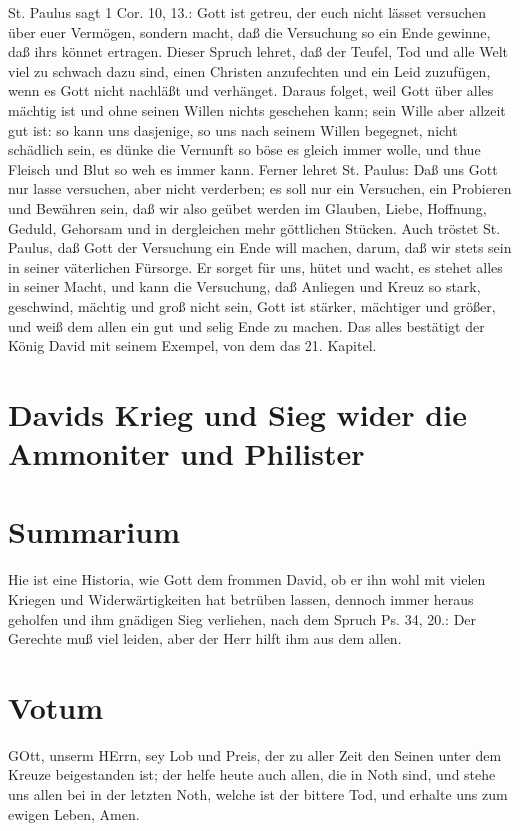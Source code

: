 St. Paulus sagt 1 Cor. 10, 13.: Gott ist getreu, der euch nicht lässet versuchen über euer Vermögen, sondern macht, daß die Versuchung so ein Ende gewinne, daß ihrs könnet ertragen. Dieser Spruch lehret, daß der Teufel, Tod und alle Welt viel zu schwach dazu sind, einen Christen anzufechten und ein Leid zuzufügen, wenn es Gott nicht nachläßt und verhänget. Daraus folget, weil Gott über alles mächtig ist und ohne seinen Willen nichts geschehen kann; sein Wille aber allzeit gut ist: so kann uns dasjenige, so uns nach seinem Willen begegnet, nicht schädlich sein, es dünke die Vernunft so böse es gleich immer wolle, und thue Fleisch und Blut so weh es immer kann. Ferner lehret St. Paulus: Daß uns Gott nur lasse versuchen, aber nicht verderben; es soll nur ein Versuchen, ein Probieren und Bewähren sein, daß wir also geübet werden im Glauben, Liebe, Hoffnung, Geduld, Gehorsam und in dergleichen mehr göttlichen
Stücken. Auch tröstet St. Paulus, daß Gott der Versuchung ein Ende will machen, darum, daß wir stets sein in seiner väterlichen Fürsorge. Er sorget für uns, hütet und wacht, es stehet alles in seiner Macht, und kann die Versuchung, daß Anliegen und Kreuz so stark, geschwind, mächtig und groß nicht sein, Gott ist stärker, mächtiger und größer, und weiß dem allen ein gut und selig Ende zu machen. Das alles bestätigt der König David mit seinem Exempel, von dem das 21. Kapitel.

\section[Davids Krieg und Sieg wider die Ammoniter und Philister]{Davids Krieg und Sieg wider die Ammoniter und Philister}

\section{Summarium}

Hie ist eine Historia, wie Gott dem frommen David, ob er ihn wohl mit vielen Kriegen und Widerwärtigkeiten hat betrüben lassen, dennoch immer heraus geholfen und ihm gnädigen Sieg verliehen, nach dem Spruch Ps. 34, 20.: Der Gerechte muß viel leiden, aber der Herr hilft ihm aus dem allen.

\section{Votum}

GOtt, unserm HErrn, sey Lob und Preis, der zu aller Zeit den Seinen unter dem Kreuze beigestanden ist; der helfe heute auch allen, die in Noth sind, und stehe uns allen bei in der letzten Noth, welche ist der bittere Tod, und erhalte uns zum ewigen Leben, Amen.

